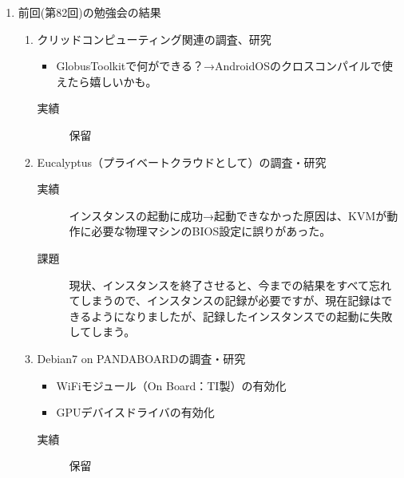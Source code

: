 \documentclass[cjk,dvipdfmx,10pt,compress,%
hyperref={bookmarks=true,bookmarksnumbered=true,bookmarksopen=false,%
colorlinks=false,%
pdftitle={第 82 回 関西 Debian 勉強会},%
pdfauthor={倉敷・のがた・佐々木・かわだ・八津尾},%
pdfsubject={資料},%
}]{beamer}
\begin{document}
\begin{frame}
\begin{enumerate}
  \item 前回(第82回)の勉強会の結果

    \begin{enumerate}
    \item クリッドコンピューティング関連の調査、研究
      \begin{itemize}
      \item GlobusToolkitで何ができる？→AndroidOSのクロスコンパイルで使えたら嬉しいかも。
      \end{itemize}
      \begin{description}
      \item[実績] 保留
      \end{description}
    \item Eucalyptus（プライベートクラウドとして）の調査・研究
      \begin{description}
      \item[実績] インスタンスの起動に成功→起動できなかった原因は、KVMが動作に必要な物理マシンのBIOS設定に誤りがあった。
      \item[課題] 現状、インスタンスを終了させると、今までの結果をすべて忘れてしまうので、インスタンスの記録が必要ですが、現在記録はできるようになりましたが、記録したインスタンスでの起動に失敗してしまう。
      \end{description}
    \item Debian7 on PANDABOARDの調査・研究
      \begin{itemize}
      \item WiFiモジュール（On Board：TI製）の有効化
      \item GPUデバイスドライバの有効化
      \end{itemize}
      \begin{description}
      \item[実績] 保留
      \end{description}
    \end{enumerate}
  \end{enumerate}
\end{frame}
\end{document}
